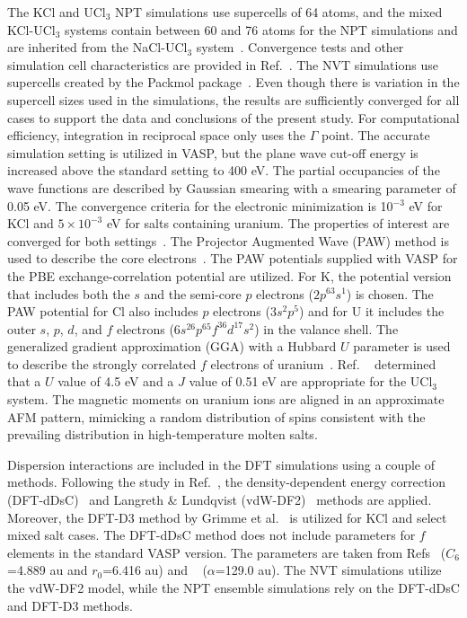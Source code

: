 \documentclass[preprint,3p,10pt,twocolumn,number,sort&compress]{elsarticle}
\begin{document}
The KCl and UCl$_3$ NPT simulations use supercells of 64 atoms, and the mixed KCl-UCl$_3$ systems contain between 60 and 76 atoms for the NPT simulations and are inherited from the NaCl-UCl$_3$ system~\cite{Andersson}. Convergence tests and other simulation cell characteristics are provided in Ref.~\cite{Andersson}.  
The NVT simulations use supercells created by the Packmol package~\cite{packmol}. Even though there is variation in the supercell sizes used in the simulations, the results are sufficiently converged for all cases to support the data and conclusions of the present study. 
For computational efficiency, integration in reciprocal space only uses the $\Gamma$ point. 
The accurate simulation setting is utilized in VASP, but the plane wave cut-off energy is increased above the standard setting to 400 eV. The partial occupancies of the wave functions are described by Gaussian smearing with a smearing parameter of 0.05 eV. The convergence criteria for the electronic minimization is 10$^{-3}$ eV for KCl and $5\times10^{-3}$ eV for salts containing uranium.
The properties of interest are converged for both settings~\cite{Andersson}. The Projector Augmented Wave (PAW) method is used to describe the core electrons~\cite{PAW1,PAW2}. The PAW potentials supplied with VASP for the PBE exchange-correlation potential are utilized. For K, the potential version that includes both the $s$ and the semi-core $p$ electrons ($2p^63s^1$) is chosen. The PAW potential for Cl also includes $p$ electrons ($3s^2p^5$) and for U it includes the outer $s$, $p$, $d$, and $f$ electrons ($6s^26p^65f^36d^17s^2$) in the valance shell.
The generalized gradient approximation (GGA) with a Hubbard $U$ parameter is used to describe the strongly correlated $f$ electrons of uranium~\cite{Andersson}. 
Ref. ~\cite{Andersson} determined that a $U$ value of 4.5 eV and a $J$ value of 0.51 eV are appropriate for the UCl$_3$ system. 
The magnetic moments on uranium ions are aligned in an approximate AFM pattern, mimicking a random distribution of spins consistent with the prevailing distribution in high-temperature molten salts.

Dispersion interactions are included in the DFT simulations using a couple of methods. 
Following the study in Ref.~\cite{Andersson}, the density-dependent energy correction (DFT-dDsC)~\cite{Steinmann2011,Steinmann2} and Langreth \& Lundqvist (vdW-DF2)~\cite{Dion2004,Klimes2010} methods are applied. Moreover, the DFT-D3 method by Grimme et al.~\cite{Grimme} is utilized for KCl and select mixed salt cases. The DFT-dDsC method does not include parameters for $f$ elements in the standard VASP version. The parameters are taken from Refs~\cite{Kim} ($C_6$=4.889 au and $r_0$=6.416 au) and ~\cite{pol} ($\alpha$=129.0 au). The NVT simulations utilize the vdW-DF2 model, while the NPT ensemble simulations rely on the DFT-dDsC and DFT-D3 methods.
\end{document}
